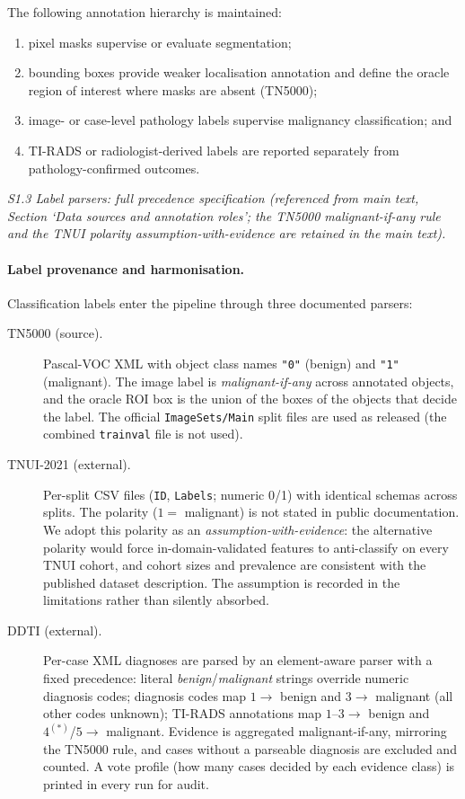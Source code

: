\documentclass[11pt]{article}
\begin{document}
The following annotation hierarchy is maintained:

\begin{enumerate}
  \item pixel masks supervise or evaluate segmentation;
  \item bounding boxes provide weaker localisation annotation and define the
  oracle region of interest where masks are absent (TN5000);
  \item image- or case-level pathology labels supervise malignancy
  classification; and
  \item TI-RADS or radiologist-derived labels are reported separately from
  pathology-confirmed outcomes.
\end{enumerate}

\noindent\emph{S1.3 Label parsers: full precedence specification (referenced from main text, Section `Data sources and annotation roles'; the TN5000 malignant-if-any rule and the TNUI polarity assumption-with-evidence are retained in the main text).}

\paragraph{Label provenance and harmonisation.}
Classification labels enter the pipeline through three documented parsers:

\begin{description}
  \item[TN5000 (source).] Pascal-VOC XML with object class names
  \texttt{"0"} (benign) and \texttt{"1"} (malignant). The image label is
  \emph{malignant-if-any} across annotated objects, and the oracle ROI box
  is the union of the boxes of the objects that decide the label. The
  official \texttt{ImageSets/Main} split files are used as released (the
  combined \texttt{trainval} file is not used).
  \item[TNUI-2021 (external).] Per-split CSV files (\texttt{ID},
  \texttt{Labels}; numeric 0/1) with identical schemas across splits. The
  polarity ($1 = $ malignant) is not stated in public documentation. We
  adopt this polarity as an \emph{assumption-with-evidence}: the
  alternative polarity
  would force in-domain-validated features to anti-classify on every TNUI
  cohort, and cohort sizes and prevalence are consistent with the
  published dataset description. The assumption is recorded in the
  limitations rather than silently absorbed.
  \item[DDTI (external).] Per-case XML diagnoses are parsed by an
  element-aware parser with a fixed precedence: literal
  \emph{benign}/\emph{malignant} strings override numeric diagnosis codes;
  diagnosis codes map $1 \rightarrow$ benign and $3 \rightarrow$
  malignant (all other codes unknown); TI-RADS annotations map
  $1$--$3 \rightarrow$ benign and $4^{(\ast)}$/$5 \rightarrow$ malignant.
  Evidence is aggregated malignant-if-any, mirroring the TN5000 rule, and
  cases without a parseable diagnosis are excluded and counted. A vote
  profile (how many cases decided by each evidence class) is printed in
  every run for audit.
\end{description}
\end{document}
